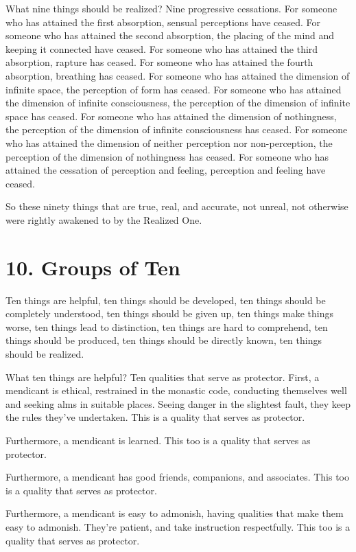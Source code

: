 \documentclass[12pt,openany]{book}%
\begin{document}
What nine things should be realized? Nine progressive cessations. For someone who has attained the first absorption, sensual perceptions have ceased. For someone who has attained the second absorption, the placing of the mind and keeping it connected have ceased. For someone who has attained the third absorption, rapture has ceased. For someone who has attained the fourth absorption, breathing has ceased. For someone who has attained the dimension of infinite space, the perception of form has ceased. For someone who has attained the dimension of infinite consciousness, the perception of the dimension of infinite space has ceased. For someone who has attained the dimension of nothingness, the perception of the dimension of infinite consciousness has ceased. For someone who has attained the dimension of neither perception nor non-perception, the perception of the dimension of nothingness has ceased. For someone who has attained the cessation of perception and feeling, perception and feeling have ceased. 

So these ninety things that are true, real, and accurate, not unreal, not otherwise were rightly awakened to by the Realized One. 

\section*{10. Groups of Ten }

Ten things are helpful, ten things should be developed, ten things should be completely understood, ten things should be given up, ten things make things worse, ten things lead to distinction, ten things are hard to comprehend, ten things should be produced, ten things should be directly known, ten things should be realized. 

What ten things are helpful? Ten qualities that serve as protector. First, a mendicant is ethical, restrained in the monastic code, conducting themselves well and seeking alms in suitable places. Seeing danger in the slightest fault, they keep the rules they’ve undertaken. This is a quality that serves as protector. 

Furthermore, a mendicant is learned. This too is a quality that serves as protector. 

Furthermore, a mendicant has good friends, companions, and associates. This too is a quality that serves as protector. 

Furthermore, a mendicant is easy to admonish, having qualities that make them easy to admonish. They’re patient, and take instruction respectfully. This too is a quality that serves as protector. 
\end{document}
